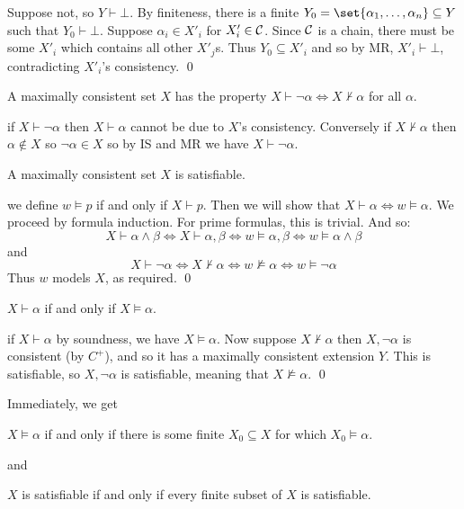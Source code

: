 Suppose not, so $Y\vdash\bot$.
By finiteness, there is a finite $Y_0=\set{\alpha_1,\dots,\alpha_n}\subseteq Y$ such that
$Y_0\vdash\bot$.
Suppose $\alpha_i\in X'_i$ for $X'_i\in{\cal C}$.
Since ${\cal C}$ is a chain, there must be some $X'_i$ which contains all other $X'_j$s.
Thus $Y_0\subseteq X'_i$ and so by MR, $X'_i\vdash\bot$, contradicting $X'_i$'s consistency.
\qed

\blemm

    A maximally consistent set $X$ has the property $X\vdash\neg\alpha\iff X\nvdash\alpha$ for all
    $\alpha$.

\elemm

\Proof  if $X\vdash\neg\alpha$ then $X\vdash\alpha$ cannot be due to $X$'s consistency.
Conversely if $X\nvdash\alpha$ then $\alpha\notin X$ so $\neg\alpha\in X$ so by IS and MR we have
$X\vdash\neg\alpha$.

\blemm

    A maximally consistent set $X$ is satisfiable.

\elemm

\Proof we define $w\vDash p$ if and only if $X\vdash p$.
Then we will show that $X\vdash\alpha\iff w\vDash\alpha$.
We proceed by formula induction.
For prime formulas, this is trivial.
And so:
$$ X\vdash\alpha\land\beta \iff X\vdash\alpha,\beta \iff w\vDash\alpha,\beta \iff
w\vDash\alpha\land\beta $$
and
$$ X\vdash\neg\alpha \iff X\nvdash\alpha \iff w\nvDash\alpha \iff w\vDash\neg\alpha $$
Thus $w$ models $X$, as required.
\qed

\bthrm[title=The Completeness Theorem]

    $X\vdash\alpha$ if and only if $X\vDash\alpha$.

\ethrm

\Proof if $X\vdash\alpha$ by soundness, we have $X\vDash\alpha$.
Now suppose $X\nvdash\alpha$ then $X,\neg\alpha$ is consistent (by $C^+$), and so it has a
maximally consistent extension $Y$.
This is satisfiable, so $X,\neg\alpha$ is satisfiable, meaning that $X\nvDash\alpha$.
\qed

Immediately, we get

\bthrm[title=The Finiteness Theorem]

    $X\vDash\alpha$ if and only if there is some finite $X_0\subseteq X$ for which
    $X_0\vDash\alpha$.

\ethrm

and

\bthrm[title=The Compactness Theorem]

    $X$ is satisfiable if and only if every finite subset of $X$ is satisfiable.

